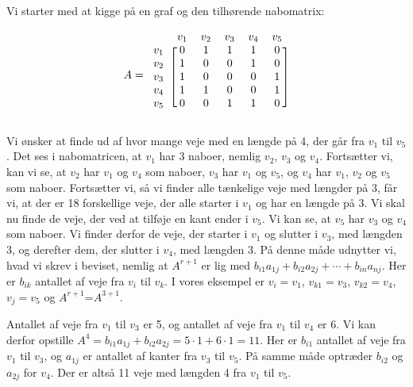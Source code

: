 \begin{exmp}
Vi starter med at kigge på en graf og den tilhørende nabomatrix:



\begin{equation}
A=
\begin{blockarray}{rccccc}
	&v_1&v_2&v_3&v_4&v_5 \\
\begin{block}{r[ccccc]}
	v_1&0&1&1&1&0 \\
	v_2&1&0&0&1&0 \\
	v_3&1&0&0&0&1 \\
	v_4&1&1&0&0&1 \\
	v_5&0&0&1&1&0 \\
\end{block}
\end{blockarray}	
\end{equation}

Vi ønsker at finde ud af hvor mange veje med en længde på 4, der går fra $v_1$ til $v_5$. Det ses i nabomatricen, at $v_1$ har 3 naboer, nemlig $v_2$, $v_3$ og $v_4$. Fortsætter vi, kan vi se, at $v_2$ har $v_1$ og $v_4$ som naboer, $v_3$ har $v_1$ og $v_5$, og $v_4$ har $v_1$, $v_2$ og $v_5$ som naboer. Fortsætter vi, så vi finder alle tænkelige veje med længder på 3, får vi, at der er 18 forskellige veje, der alle starter i $v_1$ og har en længde på 3. Vi skal nu finde de veje, der ved at tilføje en kant ender i $v_5$. Vi kan se, at $v_5$ har $v_3$ og $v_4$ som naboer. Vi finder derfor de veje, der starter i $v_1$ og slutter i $v_3$, med længden 3, og derefter dem, der slutter i $v_4$, med længden 3. På denne måde udnytter vi, hvad vi skrev i beviset, nemlig at
\textbf{$A^{r+1}$} er lig med $b_{i1}a_{1j} + b_{i2}a_{2j} +\dotsb+ b_{in}a_{nj}$.
Her er $b_{ik}$ antallet af veje fra $v_{i}$ til ${v_k}$. I vores eksempel er $v_{i}=v_{1}$, ${v_{k1}}=v_{3}$, ${v_{k2}}=v_{4}$, $v_{j}=v_{5}$ og \textbf{$A^{r+1}$}=\textbf{$A^{3+1}$}. 
 


Antallet af veje fra $v_{1}$ til $v_{3}$ er 5, og antallet af veje fra $v_{1}$ til $v_{4}$ er 6. Vi kan derfor opstille
\textbf{$A^{4}$}$=b_{i1} a_{1j}+b_{i2} a_{2j}=5 \cdot 1+6 \cdot 1=11$.
Her er $b_{i1}$ antallet af veje fra $v_{1}$ til $v_{3}$, og $a_{1j}$ er antallet af kanter fra $v_{3}$ til  $v_{5}$. På samme måde optræder $b_{i2}$ og $a_{2j}$ for $v_{4}$. Der er altså 11 veje med længden 4 fra $v_{1}$ til $v_{5}$.

\end{exmp}


